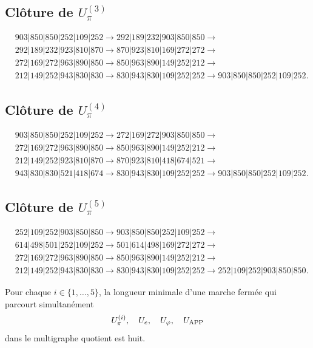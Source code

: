 \subsection{Clôture de \texorpdfstring{\(U_\pi^{(3)}\)}{U-pi 3}}
\begin{align*}
&903|850|850|252|109|252\to
292|189|232|903|850|850\to\\
&292|189|232|923|810|870\to
870|923|810|169|272|272\to\\
&272|169|272|963|890|850\to
850|963|890|149|252|212\to\\
&212|149|252|943|830|830\to
830|943|830|109|252|252\to
903|850|850|252|109|252.
\end{align*}

\subsection{Clôture de \texorpdfstring{\(U_\pi^{(4)}\)}{U-pi 4}}
\begin{align*}
&903|850|850|252|109|252\to
272|169|272|903|850|850\to\\
&272|169|272|963|890|850\to
850|963|890|149|252|212\to\\
&212|149|252|923|810|870\to
870|923|810|418|674|521\to\\
&943|830|830|521|418|674\to
830|943|830|109|252|252\to
903|850|850|252|109|252.
\end{align*}

\subsection{Clôture de \texorpdfstring{\(U_\pi^{(5)}\)}{U-pi 5}}
\begin{align*}
&252|109|252|903|850|850\to
903|850|850|252|109|252\to\\
&614|498|501|252|109|252\to
501|614|498|169|272|272\to\\
&272|169|272|963|890|850\to
850|963|890|149|252|212\to\\
&212|149|252|943|830|830\to
830|943|830|109|252|252\to
252|109|252|903|850|850.
\end{align*}

\begin{theorem}
\label{gfp:b:thm:minimalidad-cierres-pi-autonoma}
Pour chaque \(i\in\{1,\ldots,5\}\), la longueur minimale d’une marche fermée
qui parcourt simultanément
\[
 U_\pi^{(i)},\quad U_e,\quad U_\varphi,\quad U_{\rm APP}
\]
dans le multigraphe quotient est huit.
\end{theorem}

